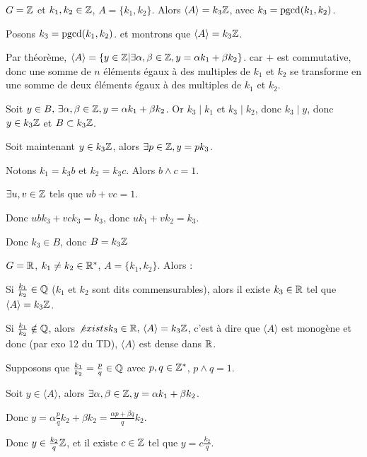 \begin{exemple}
    $G = \mathbb{Z}$ et $k_1, k_2 \in \mathbb{Z}$, $A = \{k_1, k_2\}$. 
    Alors $\langle A \rangle = k_3 \mathbb{Z}$, avec $k_3 = \operatorname{pgcd}(k_1, k_2)$.

    Posons $k_3 = \operatorname{pgcd}(k_1, k_2)$. et montrons que $\langle A \rangle = k_3 \mathbb{Z}$.

    Par théorème, $\langle A \rangle = \{y \in \mathbb{Z} | \exists \alpha, \beta \in \mathbb{Z}, y = \alpha k_1 + \beta k_2\}$.
    car $+$ est commutative, donc une somme de $n$ éléments égaux à des multiples de $k_1$ et $k_2$
    se transforme en une somme de deux éléments égaux à des multiples de $k_1$ et $k_2$.

    Soit $y \in B, \, \exists \alpha, \beta \in \mathbb{Z}, y = \alpha k_1 + \beta k_2$. 
    Or $k_3 \mid k_1$ et $k_3 \mid k_2$, donc $k_3 \mid y$, donc $y \in k_3 \mathbb{Z}$ et 
    $B \subset k_3 \mathbb{Z}$.

    Soit maintenant $y \in k_3 \mathbb{Z}$, alors $\exists p \in \mathbb{Z}, y = p k_3$.

    Notons $k_1 = k_3 b$ et $k_2 = k_3 c$. Alors $b \wedge c = 1$.

    $\exists u, v \in \mathbb{Z}$ tels que $ub + vc = 1$.

    Donc $ubk_3 + vck_3 = k_3$, donc $uk_1 + vk_2 = k_3$.

    Donc $k_3 \in B$, donc $B = k_3 \mathbb{Z}$


    $G = \mathbb{R}$, $k_1 \neq k_2 \in \mathbb{R}^*$, $A = \{k_1, k_2\}$. Alors : 

    Si $\frac{k_1}{k_2} \in \mathbb{Q}$ ($k_1$ et $k_2$ sont dits commensurables), alors il existe 
    $k_3 \in \mathbb{R}$ tel que $\langle A \rangle = k_3 \mathbb{Z}$.

    Si $\frac{k_1}{k_2} \notin \mathbb{Q}$, alors $\not exists k_3 \in \mathbb{R}, \, \langle A \rangle = k_3 \mathbb{Z}$, 
    c'est à dire que $\langle A \rangle$ est monogène et donc (par exo 12 du TD), 
    $\langle A \rangle$ est dense dans $\mathbb{R}$.


    \svspace Supposons que $\frac{k_1}{k_2} = \frac p q \in \mathbb{Q}$ avec $p, q \in \mathbb{Z}^*$, $p \wedge q = 1$.

    Soit $y \in \langle A \rangle$, alors $\exists \alpha, \beta \in \mathbb{Z}, y = \alpha k_1 + \beta k_2$.

    Donc $\displaystyle y = \alpha \frac p q k_2 + \beta k_2 = \frac{\alpha p + \beta q} q k_2$.

    Donc $y \in \frac{k_2} q \mathbb{Z}$, et il existe $c \in \mathbb{Z}$ tel que $\displaystyle y = c \frac{k_2} q$.


\end{exemple}
